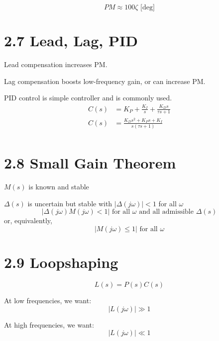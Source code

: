 
\begin{equation*}
    PM \approx 100\zeta \text{ [deg]}
\end{equation*}

\section*{2.7 Lead, Lag, PID}

Lead compensation increases PM.

Lag compensation boosts low-frequency gain, or can increase PM.

PID control is simple controller and is commonly used.
\begin{equation*}
    \begin{aligned}
        C(s) & = K_P + \frac{K_I}{s} + \frac{K_D s}{\tau s + 1} \\
        C(s) & = \frac{K_D s^2 + K_P s + K_I}{s (\tau s + 1)}   \\
    \end{aligned}
\end{equation*}

\section*{2.8 Small Gain Theorem}


\(M(s)\) is known and stable

\(\Delta(s)\) is uncertain but stable with \( |\Delta(j\omega)| < 1 \) for all \( \omega \)
\begin{equation*}
    \left| \Delta(j\omega)M(j\omega) < 1 \right| \text{ for all } \omega \text{ and all admissible } \Delta(s)
\end{equation*}
or, equivalently,
\begin{equation*}
    \left| M(j\omega) \leq 1 \right| \text{ for all } \omega
\end{equation*}


\section*{2.9 Loopshaping}

\begin{equation*}
    L(s) = P(s)C(s)
\end{equation*}

At low frequencies, we want:
\begin{equation*}
    \left| L(j\omega) \right| \gg 1
\end{equation*}

At high frequencies, we want:
\begin{equation*}
    \left| L(j\omega) \right| \ll 1
\end{equation*}

